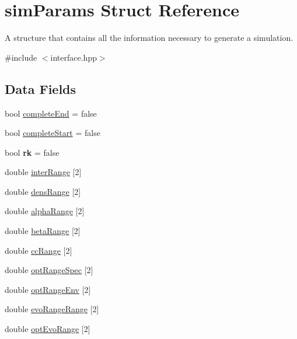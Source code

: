 \hypertarget{structsimParams}{}\section{sim\+Params Struct Reference}
\label{structsimParams}


A structure that contains all the information necessary to generate a simulation.  




{\ttfamily \#include $<$interface.\+hpp$>$}

\subsection*{Data Fields}
\begin{DoxyCompactItemize}
\item 
bool \hyperlink{structsimParams_a7b06eae32b1691cb52bfc4a7e135f589}{complete\+End} = false
\item 
bool \hyperlink{structsimParams_ad96e572c78fc800e13936b937f3addca}{complete\+Start} = false
\item 
\mbox{\label{structsimParams_ab73f45f2fefc0df819177fac8ecbdb00}} 
bool {\bfseries rk} = false
\item 
double \hyperlink{structsimParams_a459d8e2a902ef06f2e6ccce91a5f40bc}{inter\+Range} \mbox{[}2\mbox{]}
\item 
double \hyperlink{structsimParams_a48b3258fb2eabaf36a4392a3be846366}{dens\+Range} \mbox{[}2\mbox{]}
\item 
double \hyperlink{structsimParams_a2674f228bf6b33bf35dc6d1cfb6befba}{alpha\+Range} \mbox{[}2\mbox{]}
\item 
double \hyperlink{structsimParams_a676b73cd7d60743090c9f2b4c166c083}{beta\+Range} \mbox{[}2\mbox{]}
\item 
double \hyperlink{structsimParams_a730247ea2898e90b85dd99c55d8a18e3}{cc\+Range} \mbox{[}2\mbox{]}
\item 
double \hyperlink{structsimParams_a169d5e6c66da8b477bb7e384fe4c90b8}{opt\+Range\+Spec} \mbox{[}2\mbox{]}
\item 
double \hyperlink{structsimParams_ab59d469330753aebd7ce7ab893a6eda4}{opt\+Range\+Env} \mbox{[}2\mbox{]}
\item 
double \hyperlink{structsimParams_a328c95295bd7872174fa9a22c9c402cd}{evo\+Range\+Range} \mbox{[}2\mbox{]}
\item 
double \hyperlink{structsimParams_a2822e99362ed71f123e812a8fd9ad443}{opt\+Evo\+Range} \mbox{[}2\mbox{]}

\end{DoxyCompactItemize}
